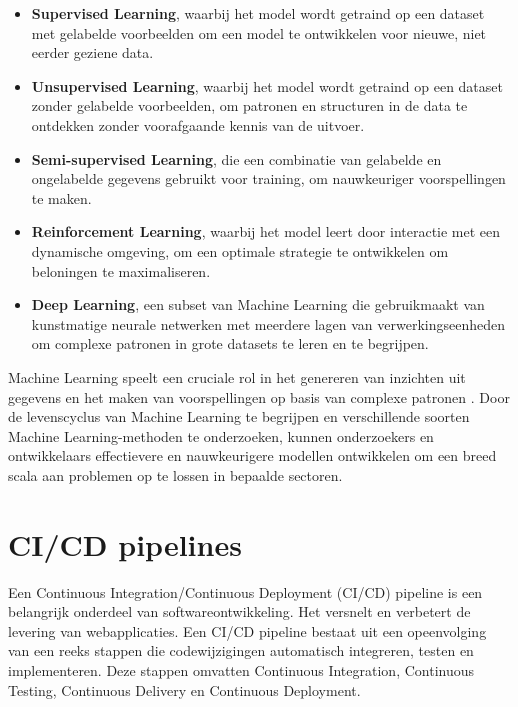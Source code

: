 \begin{itemize}
    \item \textbf{Supervised Learning}, waarbij het model wordt getraind op een dataset met gelabelde voorbeelden om een model te ontwikkelen voor nieuwe, niet eerder geziene data.

    \item \textbf{Unsupervised Learning}, waarbij het model wordt getraind op een dataset zonder gelabelde voorbeelden, om patronen en structuren in de data te ontdekken zonder voorafgaande kennis van de uitvoer.

    \item \textbf{Semi-supervised Learning}, die een combinatie van gelabelde en ongelabelde gegevens gebruikt voor training, om nauwkeuriger voorspellingen te maken.

    \item \textbf{Reinforcement Learning}, waarbij het model leert door interactie met een dynamische omgeving, om een optimale strategie te ontwikkelen om beloningen te maximaliseren.

    \item \textbf{Deep Learning}, een subset van Machine Learning die gebruikmaakt van kunstmatige neurale netwerken met meerdere lagen van verwerkingseenheden om complexe patronen in grote datasets te leren en te begrijpen.
\end{itemize}

Machine Learning speelt een cruciale rol in het genereren van inzichten uit gegevens en het maken van voorspellingen op basis van complexe patronen \autocite{Jordan2015}. Door de levenscyclus van Machine Learning te begrijpen en verschillende soorten Machine Learning-methoden te onderzoeken, kunnen onderzoekers en ontwikkelaars effectievere en nauwkeurigere modellen ontwikkelen om een breed scala aan problemen op te lossen in bepaalde sectoren.

\section{CI/CD pipelines}
Een Continuous Integration/Continuous Deployment (CI/CD) pipeline is een belangrijk onderdeel van softwareontwikkeling. Het versnelt en verbetert de levering van webapplicaties. Een CI/CD pipeline bestaat uit een opeenvolging van een reeks stappen die codewijzigingen automatisch integreren, testen en implementeren. Deze stappen omvatten Continuous Integration, Continuous Testing, Continuous Delivery en Continuous Deployment.

